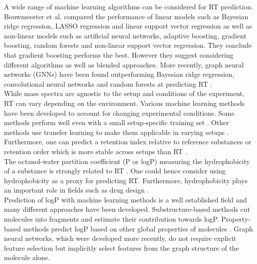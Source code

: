 \documentclass{article}
\theoremstyle{definition}
\theoremstyle{remark}
\begin{document}
A wide range of machine learning algorithms can be considered for RT prediction. Bouwmeester et al. \cite{bouwmeester2019comprehensive} compared the performance of linear models such as Bayesian ridge regression, LASSO regression and linear support vector regression as well as non-linear models such as artificial neural networks, adaptive boosting, gradient boosting, random forests and non-linear support vector regression. They conclude that gradient boosting performs the best. However they suggest considering different algorithms as well as blended approaches. More recently, graph neural networks (GNNs) have been found outperforming Bayesian ridge regression, convolutional neural networks and random forests at predicting RT \cite{yang2021prediction}.\\

While mass spectra are agnostic to the setup and conditions of the experiment, RT can vary depending on the environment. Various machine learning methods have been developed to account for changing experimental conditions. Some methods perform well even with a small setup-specific training set \cite{bouwmeester2019comprehensive}. Other methods use transfer learning to make them applicable in varying setups \cite{yang2021prediction}. Furthermore, one can predict a retention index relative to reference substances or retention order which is more stable across setups than RT \cite{qu2021predicting}.\\

The octanol-water partition coefficient (P or logP) measuring the hydrophobicity of a substance is strongly related to RT \cite{bouwmeester2019comprehensive}. One could hence consider using hydrophobicity as a proxy for predicting RT. Furthermore, hydrophobicity plays an important role in fields such as drug design \cite{tetko2004application}. \\

Prediction of logP with machine learning methods is a well established field and many different approaches have been developed. Substructure-based methods cut molecules into fragments and estimate their contribution towards logP. Property-based methods predict logP based on other global properties of molecules \cite{mannhold2009calculation}. Graph neural networks, which were developed more recently, do not require explicit feature selection but implicitly select features from the graph structure of the molecule alone.\\
\end{document}
